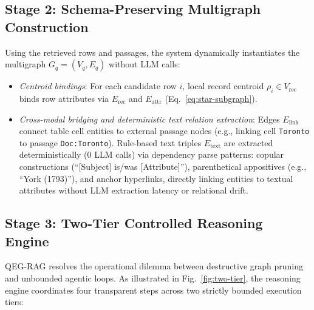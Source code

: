 \documentclass[runningheads]{llncs}
\begin{document}
\enlargethispage{2.5\baselineskip}
\subsection{Stage 2: Schema-Preserving Multigraph Construction}
\label{sec:method-kg}
Using the retrieved rows and passages, the system dynamically instantiates the multigraph $G_q=(V_q, E_q)$ without LLM calls:
\begin{itemize}[leftmargin=1.5em]
    \item \emph{Centroid bindings}: For each candidate row $i$, local record centroid $\rho_i \in V_{\text{rec}}$ binds row attributes via $E_{\text{rec}}$ and $E_{\text{attr}}$ (Eq.~\ref{eq:star-subgraph}).
    \item \emph{Cross-modal bridging and deterministic text relation extraction}: Edges $E_{\text{link}}$ connect table cell entities to external passage nodes (e.g., linking cell \texttt{Toronto} to passage \texttt{Doc:Toronto}). Rule-based text triples $E_{\text{text}}$ are extracted deterministically (0 LLM calls) via dependency parse patterns: copular constructions (``[Subject] is/was [Attribute]''), parenthetical appositives (e.g., ``York (1793)''), and anchor hyperlinks, directly linking entities to textual attributes without LLM extraction latency or relational drift.
\end{itemize}

\subsection{Stage 3: Two-Tier Controlled Reasoning Engine}
\label{sec:method-engine}



QEG-RAG resolves the operational dilemma between destructive graph pruning and unbounded agentic loops. As illustrated in Fig.~\ref{fig:two-tier}, the reasoning engine coordinates four transparent steps across two strictly bounded execution tiers:
\end{document}
